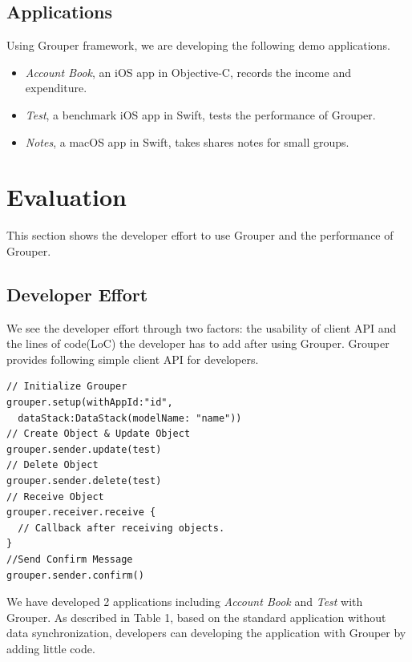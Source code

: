 \documentclass[twocolumn,10pt]{article}
\begin{document}
\subsection{Applications}

Using Grouper framework, we are developing the following demo applications. 

\begin{itemize}
	\setlength{\itemsep}{1pt}
	\setlength{\parskip}{0pt}
	\setlength{\parsep}{0pt}
	\item \emph{Account Book}, an iOS app in Objective-C, records the income and expenditure.
	\item \emph{Test}, a benchmark iOS app in Swift, tests the performance of Grouper.
	\item \emph{Notes}, a macOS app in Swift, takes shares notes for small groups.
\end{itemize}

\section{Evaluation}

This section shows the developer effort to use Grouper and the performance of Grouper.

\subsection{Developer Effort}

We see the developer effort through two factors: the usability of client API and the lines of code(LoC) the developer has to add after using Grouper. Grouper provides following simple client API for developers.

\begin{lstlisting}
// Initialize Grouper
grouper.setup(withAppId:"id",
  dataStack:DataStack(modelName: "name")) 
// Create Object & Update Object
grouper.sender.update(test)
// Delete Object
grouper.sender.delete(test)
// Receive Object
grouper.receiver.receive { 
  // Callback after receiving objects.
}
//Send Confirm Message
grouper.sender.confirm()
\end{lstlisting}

We have developed 2 applications including \emph{Account Book} and \emph{Test} with Grouper. As described in Table 1, based on the standard application without data synchronization, developers can developing the application with Grouper by adding little code. 
\end{document}
